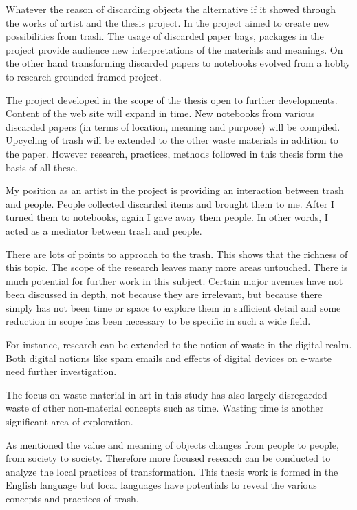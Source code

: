 Whatever the reason of discarding objects the alternative if it showed through the works of artist and the thesis project. In the project aimed to create new possibilities from trash. The usage of discarded paper bags, packages in the project provide audience new interpretations of the materials and meanings. On the other hand transforming discarded papers to notebooks evolved from a hobby to research grounded framed project.

The project developed in the scope of the thesis open to further developments. Content of the web site will expand in time. New notebooks from various discarded papers (in terms of location, meaning and purpose) will be compiled. Upcycling of trash will be extended to the other waste materials in addition to the paper. However research, practices, methods followed in this thesis form the basis of all these.

My position as an artist in the project is providing an interaction between trash and people. People collected discarded items and brought them to me. After I turned them to notebooks, again I gave away them people. In other words, I acted as a mediator between trash and people.

There are lots of points to approach to the trash. This shows that the richness of this topic. The scope of the research leaves many more areas untouched. There is much potential for further work in this subject. Certain major avenues have not been discussed in depth, not because they are irrelevant, but because there simply has not been time or space to explore them in sufficient detail and some reduction in scope has been necessary to be specific in such a wide field.

For instance, research can be extended to the notion of waste in the digital realm. Both digital notions like spam emails and  effects of digital devices on e-waste need further investigation.

The focus on waste material in art in this study has also largely disregarded waste of other non-material concepts such as time. Wasting time is another significant area of exploration.

As mentioned the value and meaning of objects changes from people to people, from society to society. Therefore more focused research can be conducted to analyze the local practices of transformation. This thesis work is formed in the English language but local languages have potentials to reveal the various concepts and practices of trash.

